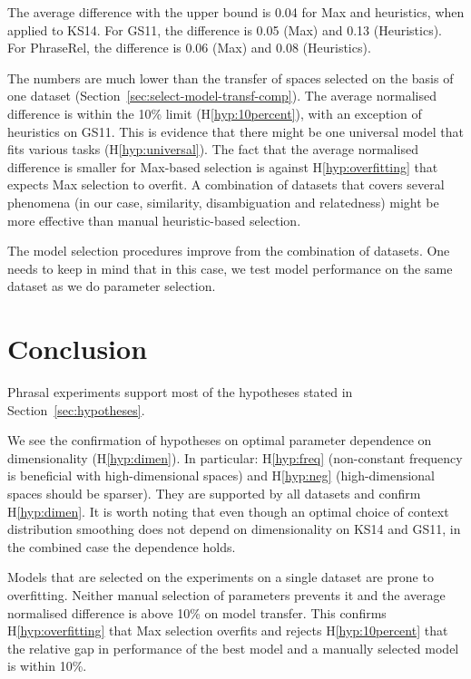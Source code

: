 The average difference with the upper bound is 0.04 for Max and heuristics, when applied to KS14. For GS11, the difference is 0.05 (Max) and 0.13 (Heuristics). For PhraseRel, the difference is 0.06 (Max) and 0.08 (Heuristics).

The numbers are much lower than the transfer of spaces selected on the basis of one dataset (Section~\ref{sec:select-model-transf-comp}). The average normalised difference is within the 10\% limit (H\ref{hyp:10percent}), with an exception of heuristics on GS11. This is evidence that there might be one universal model that fits various tasks (H\ref{hyp:universal}). The fact that the average normalised difference is smaller for Max-based selection is against H\ref{hyp:overfitting} that expects Max selection to overfit. A combination of datasets that covers several phenomena (in our case, similarity, disambiguation and relatedness) might be more effective than manual heuristic-based selection.

The model selection procedures improve from the combination of datasets. One needs to keep in mind that in this case, we test model performance on the same dataset as we do parameter selection.

\section{Conclusion}
\label{sec:conclusion-comp}

Phrasal experiments support most of the hypotheses stated in
Section~\ref{sec:hypotheses}.

We see the confirmation of hypotheses on optimal parameter dependence on dimensionality (H\ref{hyp:dimen}). In particular: H\ref{hyp:freq} (non-constant frequency is beneficial with high-dimensional spaces) and H\ref{hyp:neg} (high-dimensional spaces should be sparser). They are supported by all datasets and confirm H\ref{hyp:dimen}. It is worth noting that even though an optimal choice of context distribution smoothing does not depend on dimensionality on KS14 and GS11, in the combined case the dependence holds.

Models that are selected on the experiments on a single dataset are prone to overfitting. Neither manual selection of parameters prevents it and the average normalised difference is above 10\% on model transfer. This confirms H\ref{hyp:overfitting} that Max selection overfits and rejects H\ref{hyp:10percent} that the relative gap in performance of the best model and a manually selected model is within 10\%.


